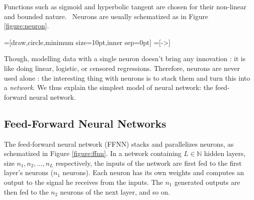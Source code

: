 \documentclass{article}
\newcommand{\N}{\mathbb N}
\begin{document}
\noindent Functions such as sigmoid and hyperbolic tangent
are chosen for their non-linear and bounded nature. 
Neurons are usually schematized as in Figure \ref{figure:neuron}.
\newpage
\begin{center}
    \label{figure:neuron}
=[draw,circle,minimum size=10pt,inner sep=0pt]
=[->]
\end{center}

Though, modelling data with a single neuron doesn't bring any innovation : it is like doing linear, 
logistic, or censored regressions. Therefore, neurons are never used alone : the interesting thing with neurons
is to stack them and turn this into a \textit{network}. We thus explain the simplest model of neural network: 
the feed-forward neural network. 

\subsection{Feed-Forward Neural Networks}\label{sec:ffnns}

The feed-forward neural network (FFNN) stacks and parallelizes neurons, as schematized in Figure \ref{figure:ffnn}. 
In a network containing $L\in \N$ hidden layers, size $n_1, n_2, ..., n_L$ respectively,
the inputs of the network are first fed to the first layer's neurons ($n_1$ neurons). Each neuron
has its own weights and computes an output to the signal he receives from the inputs. The $n_1$ generated outputs
are then fed to the $n_2$ neurons of the next layer, and so on. 
\end{document}

